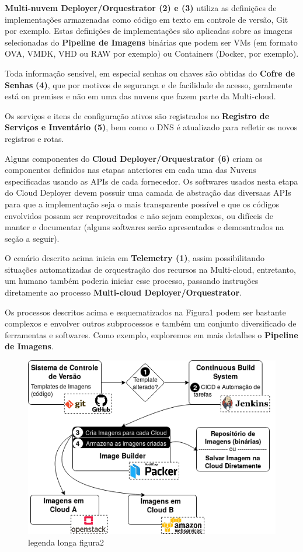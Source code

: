 \documentclass[12pt]{article}
\begin{document}
	\textbf{Multi-nuvem Deployer/Orquestrator (2) e (3)} utiliza as definições de implementações armazenadas como código em texto em controle de versão, Git por exemplo. Estas definições de implementações são aplicadas sobre as imagens selecionadas do \textbf{Pipeline de Imagens} binárias que podem ser VMs (em formato OVA, VMDK, VHD ou RAW por exemplo) ou Containers (Docker, por exemplo).
	
	Toda informação sensível, em especial senhas ou chaves são obtidas do \textbf{Cofre de Senhas} \textbf{(4)}, que por motivos de segurança e de facilidade de acesso, geralmente está on premises e não em uma das nuvens que fazem parte da Multi-cloud.   
	
	Os serviços e itens de configuração ativos são registrados no \textbf{Registro de Serviços e Inventário (5)}, bem como o DNS é atualizado para refletir os novos registros e rotas.
	
	Alguns componentes do \textbf{Cloud Deployer/Orquestrator (6)} criam os componentes definidos nas etapas anteriores em cada uma das Nuvens especificadas usando as APIs de cada fornecedor. Os softwares usados nesta etapa do Cloud Deployer devem possuir uma camada de abstração das diversaas APIs para que a implementação seja o mais transparente possível e que os códigos envolvidos possam ser reaproveitados e não sejam complexos, ou difíceis de manter e documentar (alguns softwares serão apresentados e demosntrados na seção a seguir).  

	O cenário descrito acima inicia em \textbf{Telemetry (1)}, assim possibilitando situações automatizadas de orquestração dos recursos na Multi-cloud, entretanto, um humano também poderia iniciar esse processo, passando instruções diretamente ao processo \textbf{Multi-cloud Deployer/Orquestrator}.  
	
	Os processos descritos acima e esquematizados na Figura1 podem ser bastante complexos e envolver outros subprocessos e também um conjunto diversificado de ferramentas e softwares. Como exemplo, exploremos em mais detalhes o \textbf{Pipeline de Imagens}.
		
    \begin{figure}[H]
    	\centering
    	\includegraphics[width=0.7\linewidth]{figuras/Figure2.png}
    	\caption{legenda longa figura2}
    	\label{fig:figure2}
    \end{figure}
    
\end{document}

